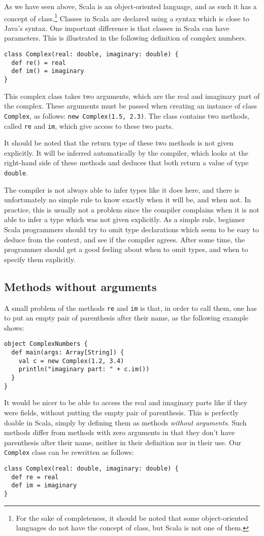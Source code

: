 \documentclass[a4paper,12pt,twoside,titlepage]{article}
\begin{document}
As we have seen above, Scala is an object-oriented language, and as
such it has a concept of class.\footnote{For the sake of completeness,
  it should be noted that some object-oriented languages do not have
  the concept of class, but Scala is not one of them.}
Classes in Scala are declared using a syntax which is close to
Java's syntax. One important difference is that classes in Scala can
have parameters. This is illustrated in the following definition of
complex numbers.
\begin{lstlisting}
class Complex(real: double, imaginary: double) {
  def re() = real
  def im() = imaginary
}
\end{lstlisting}
This complex class takes two arguments, which are the real and
imaginary part of the complex. These arguments must be passed when
creating an instance of class \lstinline?Complex?, as follows:
\lstinline?new Complex(1.5, 2.3)?. The class contains two methods,
called \lstinline?re? and \lstinline?im?, which give access to these
two parts.

It should be noted that the return type of these two methods is not
given explicitly. It will be inferred automatically by the compiler,
which looks at the right-hand side of these methods and deduces that
both return a value of type \lstinline?double?.

The compiler is not always able to infer types like it does here, and
there is unfortunately no simple rule to know exactly when it will be,
and when not. In practice, this is usually not a problem since the
compiler complains when it is not able to infer a type which was not
given explicitly. As a simple rule, beginner Scala programmers should
try to omit type declarations which seem to be easy to deduce from the
context, and see if the compiler agrees. After some time, the
programmer should get a good feeling about when to omit types, and
when to specify them explicitly.

\subsection{Methods without arguments}
\label{sec:meth-wo-args}

A small problem of the methods \lstinline?re? and \lstinline?im? is that, in
order to call them, one has to put an empty pair of parenthesis after
their name, as the following example shows:
\begin{lstlisting}
object ComplexNumbers {
  def main(args: Array[String]) {
    val c = new Complex(1.2, 3.4)
    println("imaginary part: " + c.im())
  }
}
\end{lstlisting}
It would be nicer to be able to access the real and imaginary parts
like if they were fields, without putting the empty pair of
parenthesis. This is perfectly doable in Scala, simply by defining
them as methods \emph{without arguments}. Such methods differ from
methods with zero arguments in that they don't have parenthesis after
their name, neither in their definition nor in their use. Our
\lstinline?Complex? class can be rewritten as follows:
\begin{lstlisting}
class Complex(real: double, imaginary: double) {
  def re = real
  def im = imaginary
}
\end{lstlisting}
\end{document}
